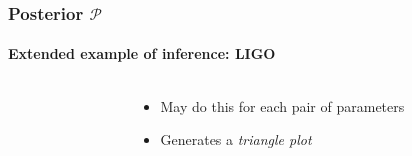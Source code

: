 \documentclass[%
]{beamer}
\begin{document}
\begin{frame}
    \frametitle{Posterior $\mathcal{P}$}
    \framesubtitle{Extended example of inference: LIGO}

	\begin{columns}
	\begin{column}{0.65\textwidth}
	\end{column}
	\begin{column}{0.35\textwidth}
		\begin{itemize}
          \item<2-> May do this for each pair of parameters
          \item<3-> Generates a {\em triangle plot}
		\end{itemize}
	\end{column}
	\end{columns}

\end{frame}
\end{document}
